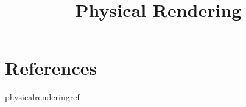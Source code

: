 \documentclass[preview]{standalone}
\begin{document}
\title{Physical Rendering}
\genpage

\nocite{*} %

\section{References}

\begin{snippet}{physicalrenderingref}
\printbibliography[heading=none]
\end{snippet}
\end{document}
